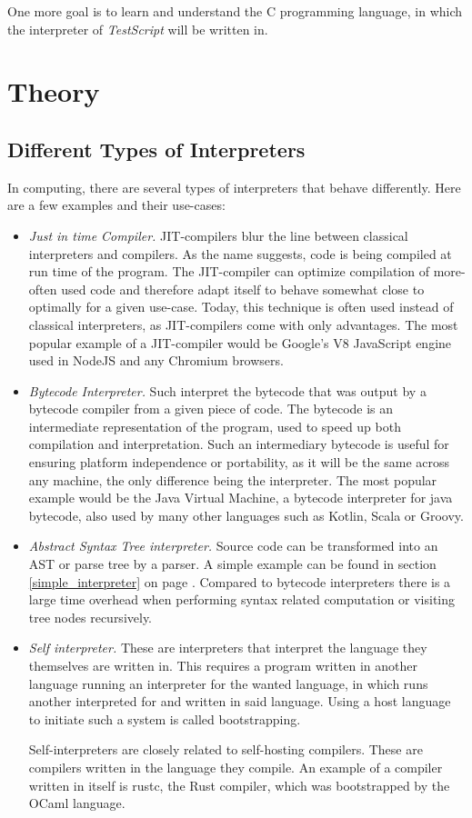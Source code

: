 \documentclass[12pt,a4paper]{article}
\newcommand{\name}{\emph{TestScript}}
\begin{document}
One more goal is to learn and understand the C programming language, in which
the interpreter of \name{} will be written in.

\section{Theory}
\subsection{Different Types of Interpreters}
In computing, there are several types of interpreters that behave differently.
Here are a few examples and their use-cases:
\begin{itemize}
    \item \emph{Just in time Compiler.} JIT-compilers blur the line between
        classical interpreters and compilers. As the name suggests, code is
        being compiled at run time of the program. The JIT-compiler can optimize
        compilation of more-often used code and therefore adapt itself to
        behave somewhat close to optimally for a given use-case. Today, this 
        technique is often used instead of classical interpreters, as
        JIT-compilers come with only advantages. The most popular example of
        a JIT-compiler would be Google's V8 JavaScript engine used
        in NodeJS and any Chromium browsers.
    \item \emph{Bytecode Interpreter.} Such interpret the bytecode that was
        output by a bytecode compiler from a given piece of code. The bytecode
        is an intermediate representation of the program, used to speed up
        both compilation and interpretation. Such an intermediary bytecode is
        useful for ensuring platform independence or portability, as it will be
        the same across any machine, the only difference being the interpreter.
        The most popular example would be the Java Virtual Machine,
        a bytecode interpreter for java bytecode, also used by many other languages
        such as Kotlin, Scala or Groovy.
    \item \emph{Abstract Syntax Tree interpreter.} Source code can be
        transformed into an AST or parse tree by a parser. A simple example
        can be found in section \ref{simple_interpreter}
        on page \pageref{simple_interpreter}. Compared to bytecode interpreters
        there is a large time overhead when performing syntax related computation
        or visiting tree nodes recursively.
    \item \emph{Self interpreter.} These are interpreters that interpret the
        language they themselves are written in. This requires a program
        written in another language running an interpreter for the wanted
        language, in which runs another interpreted for and written in said
        language. Using a host language to initiate such a system is called
        bootstrapping.

        Self-interpreters are closely related to self-hosting compilers. These
        are compilers written in the language they compile.
        An example of a compiler written in itself is rustc, the Rust
        compiler, which was bootstrapped by the OCaml language.
\end{itemize}
\end{document}
